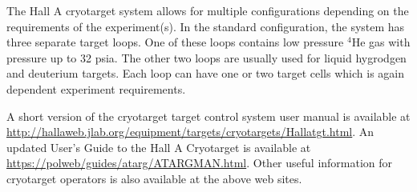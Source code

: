 


The Hall A cryotarget system allows for multiple configurations depending
on the requirements of the experiment(s). In the standard configuration,
the system has three separate target loops. One of these loops contains
low pressure $^{4}$He gas with pressure up to 32 psia. The other
two loops are usually used for liquid hygrodgen and deuterium targets.
Each loop can have one or two target cells which is again dependent
experiment requirements. 

A short version of the cryotarget target control system user manual
is available at \url{http://hallaweb.jlab.org/equipment/targets/cryotargets/Hallatgt.html}.
An updated User's Guide to the Hall A Cryotarget is available at \url{https://polweb/guides/atarg/ATARGMAN.html}.
Other useful information for cryotarget operators is also available
at the above web sites.


